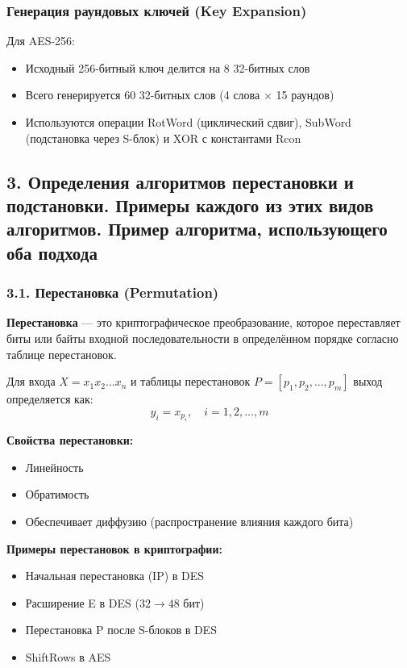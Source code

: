 \subsubsection*{Генерация раундовых ключей (Key Expansion)}

Для AES-256:
\begin{itemize}
    \item Исходный 256-битный ключ делится на 8 32-битных слов
    \item Всего генерируется 60 32-битных слов (4 слова $\times$ 15 раундов)
    \item Используются операции RotWord (циклический сдвиг), SubWord (подстановка через S-блок) и XOR с константами Rcon
\end{itemize}

\subsection*{3. Определения алгоритмов перестановки и подстановки. Примеры каждого из этих видов алгоритмов. Пример алгоритма, использующего оба подхода}

\subsubsection*{3.1. Перестановка (Permutation)}

\textbf{Перестановка} — это криптографическое преобразование, которое переставляет биты или байты входной последовательности в определённом порядке согласно таблице перестановок.

Для входа $X = x_1x_2...x_n$ и таблицы перестановок $P = [p_1, p_2, ..., p_m]$ выход определяется как:
$$y_i = x_{p_i}, \quad i = 1, 2, ..., m$$

\textbf{Свойства перестановки:}
\begin{itemize}
    \item Линейность
    \item Обратимость
    \item Обеспечивает диффузию (распространение влияния каждого бита)
\end{itemize}

\textbf{Примеры перестановок в криптографии:}
\begin{itemize}
    \item Начальная перестановка (IP) в DES
    \item Расширение E в DES ($32 \rightarrow 48$ бит)
    \item Перестановка P после S-блоков в DES
    \item ShiftRows в AES
\end{itemize}

